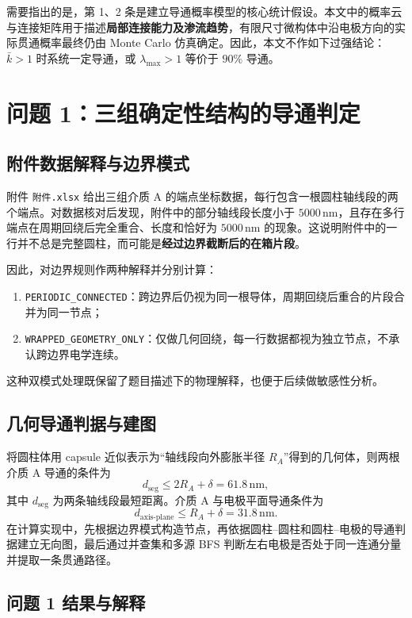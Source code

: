 需要指出的是，第 1、2 条是建立导通概率模型的核心统计假设。本文中的概率云与连接矩阵用于描述\textbf{局部连接能力及渗流趋势}，有限尺寸微构体中沿电极方向的实际贯通概率最终仍由 Monte Carlo 仿真确定。因此，本文不作如下过强结论：$\bar{k}>1$ 时系统一定导通，或 $\lambda_{\max}>1$ 等价于 $90\%$ 导通。

\section{问题 1：三组确定性结构的导通判定}

\subsection{附件数据解释与边界模式}

附件 \texttt{附件.xlsx} 给出三组介质 A 的端点坐标数据，每行包含一根圆柱轴线段的两个端点。对数据核对后发现，附件中的部分轴线段长度小于 $5000\,\mathrm{nm}$，且存在多行端点在周期回绕后完全重合、长度和恰好为 $5000\,\mathrm{nm}$ 的现象。这说明附件中的一行并不总是完整圆柱，而可能是\textbf{经过边界截断后的在箱片段}。

因此，对边界规则作两种解释并分别计算：
\begin{enumerate}
    \item \texttt{PERIODIC\_CONNECTED}：跨边界后仍视为同一根导体，周期回绕后重合的片段合并为同一节点；
    \item \texttt{WRAPPED\_GEOMETRY\_ONLY}：仅做几何回绕，每一行数据都视为独立节点，不承认跨边界电学连续。
\end{enumerate}
这种双模式处理既保留了题目描述下的物理解释，也便于后续做敏感性分析。

\subsection{几何导通判据与建图}

将圆柱体用 capsule 近似表示为“轴线段向外膨胀半径 $R_A$”得到的几何体，则两根介质 A 导通的条件为
\[
d_{\mathrm{seg}} \le 2R_A+\delta = 61.8\,\mathrm{nm},
\]
其中 $d_{\mathrm{seg}}$ 为两条轴线段最短距离。介质 A 与电极平面导通条件为
\[
d_{\mathrm{axis\mbox{-}plane}} \le R_A+\delta = 31.8\,\mathrm{nm}.
\]
在计算实现中，先根据边界模式构造节点，再依据圆柱--圆柱和圆柱--电极的导通判据建立无向图，最后通过并查集和多源 BFS 判断左右电极是否处于同一连通分量并提取一条贯通路径。

\subsection{问题 1 结果与解释}

